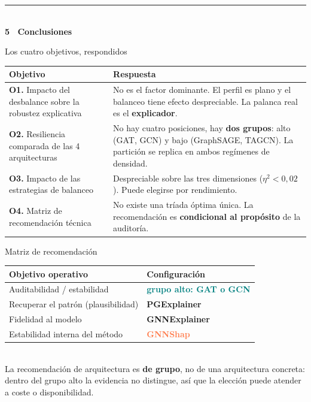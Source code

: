 \documentclass[aspectratio=169,10pt]{beamer}
\newcommand{\seccion}[1]{{%
\setbeamercolor{background canvas}{bg=navy}
\begin{frame}[plain]
\vfill
{\color{amber}\rule{0.9cm}{2pt}}\\[6pt]
{\color{white}\Large\bfseries #1}
\vfill
\end{frame}}}
\begin{document}
\seccion{5 \textperiodcentered\ Conclusiones}

\begin{frame}{Los cuatro objetivos, respondidos}
\begin{center}
\footnotesize
\renewcommand{\arraystretch}{1.55}
\begin{tabular}{p{}p{}}
\toprule
\textbf{Objetivo} & \textbf{Respuesta} \\
\midrule
\textbf{O1.} Impacto del desbalance sobre la robustez explicativa & No es el factor dominante. El perfil es plano y el balanceo tiene efecto despreciable. La palanca real es el \textbf{explicador}. \\
\textbf{O2.} Resiliencia comparada de las 4 arquitecturas & No hay cuatro posiciones, hay \textbf{dos grupos}: alto (GAT, GCN) y bajo (GraphSAGE, TAGCN). La partición se replica en ambos regímenes de densidad. \\
\textbf{O3.} Impacto de las estrategias de balanceo & Despreciable sobre las tres dimensiones ($\eta^2 < 0{,}02$). Puede elegirse por rendimiento. \\
\textbf{O4.} Matriz de recomendación técnica & No existe una tríada óptima única. La recomendación es \textbf{condicional al propósito} de la auditoría. \\
\bottomrule
\end{tabular}
\end{center}
\end{frame}

\begin{frame}{Matriz de recomendación}
\begin{center}
\renewcommand{\arraystretch}{1.5}
\begin{tabular}{ll}
\toprule
\textbf{Objetivo operativo} & \textbf{Configuración} \\
\midrule
Auditabilidad / estabilidad & \textcolor{teal}{\textbf{grupo alto: GAT o GCN}} \\
Recuperar el patrón (plausibilidad) & \textcolor{seafoam}{\textbf{PGExplainer}} \\
Fidelidad al modelo & \textcolor{amber}{\textbf{GNNExplainer}} \\
Estabilidad interna del método & \textcolor{coral}{\textbf{GNNShap}} \\
\bottomrule
\end{tabular}
\\[8pt]
{\footnotesize\color{muted} La recomendación de arquitectura es \textbf{de grupo}, no de una arquitectura concreta:\\dentro del grupo alto la evidencia no distingue, así que la elección puede atender a coste o disponibilidad.}
\end{center}
\end{frame}
\end{document}
